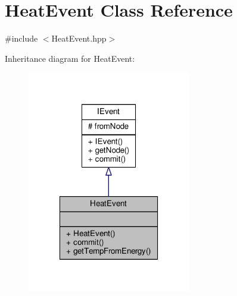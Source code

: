 \hypertarget{class_heat_event}{\section{Heat\-Event Class Reference}
\label{class_heat_event}
}


{\ttfamily \#include $<$Heat\-Event.\-hpp$>$}



Inheritance diagram for Heat\-Event\-:
\nopagebreak
\begin{figure}[H]
\begin{center}
\leavevmode
\includegraphics[width=202pt]{class_heat_event__inherit__graph}
\end{center}
\end{figure}


